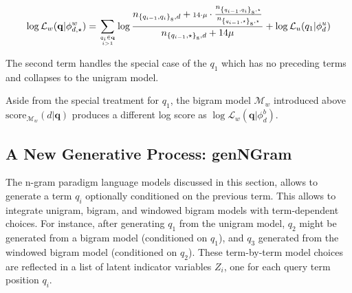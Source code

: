 \documentclass[]{article}
\begin{document}
\[
\log\mathcal{L}_{w}(\mathbf{q}|\phi_{d,\star}^{w})=\sum_{{q_{i}\in\mathbf{q}\atop i>1}}\log\frac{n_{\left\{ q_{i-1},q_{i}\right\} _{8},d}+{\scriptstyle 14\cdot\mu}\cdot\frac{n_{\left\{ q_{i-1},q_{i}\right\} _{8},\star}}{n_{\left\{ q_{i-1},\star\right\} _{8},\star}}}{n_{\left\{ q_{i-1},\star\right\} _{8},d}+14\mu} +\log\mathcal{L}_{u}(q_{1}|\phi_{d}^{u})
\]

The second term handles the special case of the $q_{1}$ which has
no preceding terms and collapses to the unigram model.

Aside from the special treatment for $q_{1}$, the bigram model $\mathcal{M}_{w}$
introduced above $\mbox{score}_{\mathcal{M}_{w}}(d|\mathbf{q})$ produces
a different log score as $\log\mathcal{L}_{w}(\mathbf{q}|\phi_{d}^{b})$.

\subsection{A New Generative Process: genNGram}

The n-gram paradigm language models discussed in this section, allows
to generate a term $q_{i}$ optionally conditioned on the previous
term. This allows to integrate unigram, bigram, and windowed bigram
models with term-dependent choices. For instance, after generating
$q_{1}$ from the unigram model, $q_{2}$ might be generated from
a bigram model (conditioned on $q_{1}$), and $q_{3}$ generated from
the windowed bigram model (conditioned on $q_{2}$). These term-by-term
model choices are reflected in a list of latent indicator variables
$Z_{i}$, one for each query term position $q_{i}$.
\end{document}

